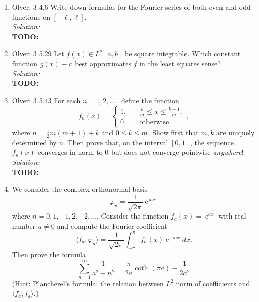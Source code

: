 \documentclass[10pt]{amsart}
\newcommand{\I}{\mathrm{i}}
\DeclareMathOperator{\E}{e}
\theoremstyle{nonumberplain}
\begin{document}
\begin{enumerate}[label={\bf {\arabic*}:}]
\begin{enumerate}
\end{enumerate}

\newpage


\item Olver: 3.4.6 Write down formulas for the Fourier series of both even and odd functions on $[-\ell, \ell]$. \\

\noindent
\textit{Solution:} \\
\textbf{TODO:}

\newpage


\item Olver: 3.5.29 Let $f(x) \in L^2[a, b]$ be square integrable.
Which constant function $g(x) \equiv c$ best approximates $f$ in the least squares sense? \\

\noindent
\textit{Solution:} \\
\textbf{TODO:}

\newpage


\item Olver: 3.5.43 For each $n = 1, 2, ..., $ define the function
$$
f_n(x) = \begin{cases} 1, \quad &\frac k m \leq x \leq \frac {k + 1} m, \\ 0, \quad & \text{otherwise}\end{cases},
$$
where $n = \frac 1 2 m (m + 1) + k$ and $0 \leq k \leq m$.
Show first that $m, k$ are uniquely determined by $n$.
Then prove that, on the interval $[0, 1]$, the sequence $f_n(x)$ converges in norm to 0 but does not converge pointwise \textit{anywhere}! \\

\noindent
\textit{Solution:} \\
\textbf{TODO:}

\newpage

\item We consider the complex orthonormal basis
$$
\varphi_n = \frac 1 {\sqrt{2 \pi}} \E^{\I n x}
$$
where $n = 0, 1, -1, 2, -2, ...$.
Consider the function $f_a(x) = \E^{ax}$ with real number $a \neq 0$ and compute the Fourier coefficient
$$
\langle f_a, \varphi_n \rangle = \frac 1 {\sqrt{2 \pi}} \int_{-\pi}^{\pi} f_a(x) \E^{- \I n x} dx.
$$
Then prove the formula
$$
\sum_{n = 1}^\infty \frac {1}{a^2 + n^2} = \frac \pi {2a} \coth (\pi a)  - \frac 1 {2a^2}
$$
(Hint: Plancherel’s formula: the relation between $L^2$ norm of coefficients and $\langle f_a, f_a \rangle$.)
\\


\end{enumerate}
\end{document}
